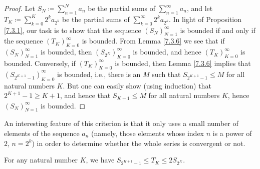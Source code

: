 \begin{proof}
    Let \(S_N \coloneqq \sum_{n = 1}^N a_n\) be the partial sums of \(\sum_{n = 1}^\infty a_n\), and let \(T_K \coloneqq \sum_{k = 0}^K 2^k a_{2^k}\) be the partial sums of \(\sum_{k = 0}^\infty 2^k a_{2^k}\).
    In light of Proposition \ref{7.3.1}, our task is to show that the sequence \((S_N)_{N = 1}^\infty\) is bounded if and only if the sequence \((T_K)_{K = 0}^\infty\) is bounded.
    From Lemma \ref{7.3.6} we see that if \((S_N)_{N = 1}^\infty\) is bounded, then \((S_{2^K})_{K = 0}^\infty\) is bounded, and hence \((T_K)_{K = 0}^\infty\) is bounded.
    Conversely, if \((T_K)_{K = 0}^\infty\) is bounded, then Lemma \ref{7.3.6} implies that \((S_{2^{K + 1} - 1})_{K = 0}^\infty\) is bounded, i.e., there is an \(M\) such that \(S_{2^{K + 1} - 1} \leq M\) for all natural numbers \(K\).
    But one can easily show (using induction) that \(2^{K + 1} - 1 \geq K + 1\), and hence that \(S_{K + 1} \leq M\) for all natural numbers \(K\), hence \((S_N)_{N = 1}^\infty\) is bounded.
\end{proof}

\begin{remark}\label{7.3.5}
    An interesting feature of this criterion is that it only uses a small number of elements of the sequence \(a_n\)
    (namely, those elements whose index \(n\) is a power of \(2\), \(n = 2^k\))
    in order to determine whether the whole series is convergent or not.
\end{remark}

\begin{lemma}\label{7.3.6}
    For any natural number \(K\), we have \(S_{2^{K + 1} - 1} \leq T_K \leq 2S_{2^K}\).
\end{lemma}

